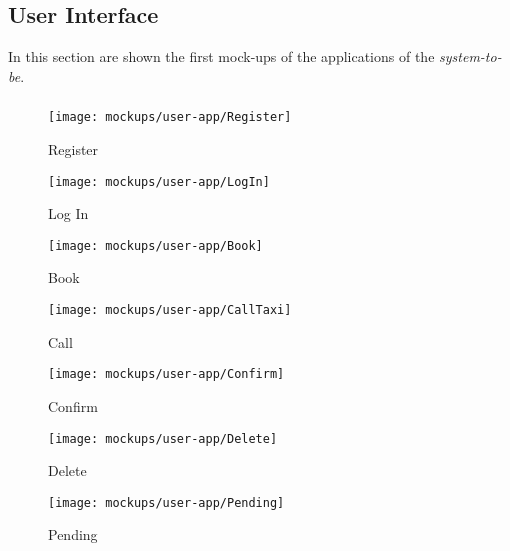 
\subsection{User Interface} %
In this section are shown the first mock-ups of the applications of the \emph{system-to-be}.

\subsubsection{ }
\begin{figure*}[h!t]
    \centering
    \begin{subfigure}[h!t]{0.25\paperwidth}
            \texttt{[image: mockups/user-app/Register]}
            \caption{Register}
    \end{subfigure}
    \hspace{0.05\paperwidth}
    \begin{subfigure}[h!t]{0.25\paperwidth}
            \texttt{[image: mockups/user-app/LogIn]}
            \caption{Log In}
    \end{subfigure}
\end{figure*}
\vfill
\clearpage

\newpage
\vfill
\begin{figure*}[h!t]
    \centering
    \begin{subfigure}[h!t]{0.25\paperwidth}
            \texttt{[image: mockups/user-app/Book]}
            \caption{Book}
    \end{subfigure}
    \hspace{0.05\paperwidth}
    \begin{subfigure}[h!t]{0.25\paperwidth}
            \texttt{[image: mockups/user-app/CallTaxi]}
            \caption{Call}
    \end{subfigure}
\end{figure*}
\vfill
\clearpage

\newpage
\vfill
\begin{figure*}[h!t]
    \centering
    \begin{subfigure}[h!t]{0.25\paperwidth}
            \texttt{[image: mockups/user-app/Confirm]}
            \caption{Confirm}
    \end{subfigure}
    \hspace{0.05\paperwidth}
    \begin{subfigure}[h!t]{0.25\paperwidth}
            \texttt{[image: mockups/user-app/Delete]}
            \caption{Delete}
    \end{subfigure}

    \begin{subfigure}[h!t]{0.25\paperwidth}
            \texttt{[image: mockups/user-app/Pending]}
            \caption{Pending}
    \end{subfigure}

\end{figure*}
\vfill
\clearpage


